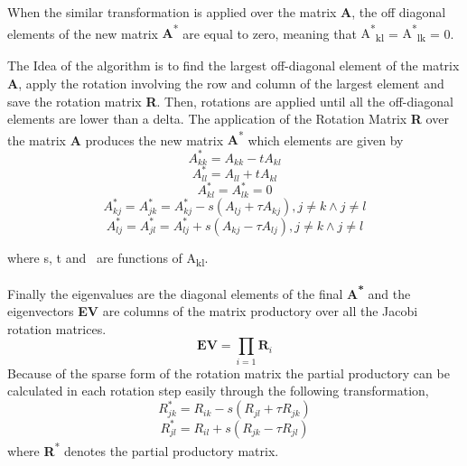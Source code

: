 \documentclass{tmr}
\begin{document}
 When the similar transformation is applied over the matrix
{\textbf A}, the off diagonal elements of the new matrix {\textbf A\textsuperscript{*}} are equal
to zero, meaning that 
{A\textsuperscript{*}\textsubscript{kl}} = {A\textsuperscript{*}\textsubscript{lk}} = 0.
\par The Idea of the algorithm is to find the largest off-diagonal element of the matrix \textbf{A},
 apply the rotation involving the row and column of the largest element and save the rotation matrix \textbf{R}. 
Then, rotations are applied until all the off-diagonal elements are lower than a delta.
The application of the Rotation Matrix \textbf{R} over the matrix \textbf{A} produces
the new matrix {\textbf A\textsuperscript{*}} which elements are given by
\begin{equation}\label{1} A^{*}_{kk} = A_{kk}  -  t A_{kl} \end{equation}
\begin{equation}\label{2} A^{*}_{ll} = A_{ll} +   t A_{kl} \end{equation}
\begin{equation}\label{3} A^{*}_{kl} =A^{*}_{lk} = 0       \end{equation}
\begin{equation}\label{4}
A^{*}_{kj} =A^{*}_{jk} = A^{*}_{kj} - s (A_{lj} + \tau A_{kj}), j \not = k \wedge j \not = l 
\end{equation}
\begin{equation}\label{5}
A^{*}_{lj} =A^{*}_{jl} = A^{*}_{lj} + s (A_{kj} - \tau A_{lj}), j \not = k \wedge j \not = l 
\end{equation}

where s, t and \texttau\ are functions of A\textsubscript{kl}.

\par Finally the eigenvalues are the diagonal elements of the final \textbf{A\textsuperscript{*}}
 and the eigenvectors {\bf EV} 
are columns of the matrix productory over all the Jacobi rotation matrices.
\[ \mathbf{EV} = \prod_{i=1} \mathbf{R}_i \]
Because of the sparse form of the rotation matrix the partial productory can 
be calculated in each rotation step easily through the following transformation,
\begin{equation}\label{6} R^{*}_{jk} = R_{ik}  -  s (R_{jl} + \tau R_{jk}) \end{equation}
\begin{equation}\label{7} R^{*}_{jl} = R_{il}  +  s (R_{jk} - \tau R_{jl}) \end{equation}
where {\textbf R\textsuperscript{*}} denotes the partial productory matrix.
\end{document}
